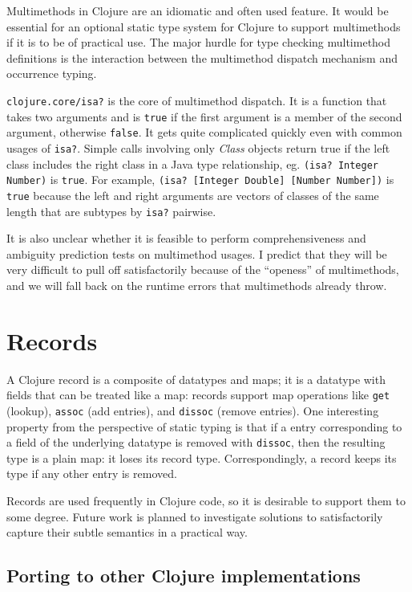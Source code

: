 Multimethods in Clojure are an idiomatic and often used feature.
It would be essential for an optional static type system for Clojure to support
multimethods if it is to be of practical use.
The major hurdle for type checking multimethod definitions is the
interaction between the multimethod dispatch mechanism and occurrence typing.

\lstinline|clojure.core/isa?| is the core of multimethod dispatch.
It is a function that takes two arguments and is \lstinline|true| if
the first argument is a member of the second argument, otherwise \lstinline|false|.
It gets quite complicated quickly even with common usages of \lstinline|isa?|.
Simple calls involving only \emph{Class} objects return true if the left class
includes the right class in a Java type relationship, eg. \lstinline|(isa? Integer Number)| is \lstinline|true|.
For example, \lstinline|(isa? [Integer Double] [Number Number])| is \lstinline|true|
because the left and right arguments are vectors of classes of the same length
that are subtypes by \lstinline|isa?| pairwise.

It is also unclear whether it is feasible to perform comprehensiveness and
ambiguity prediction tests on multimethod usages. I predict that they will be
very difficult to pull off satisfactorily because of the ``openess'' of multimethods,
and we will fall back on the runtime errors that multimethods already throw.

\section{Records}

A Clojure record is a composite of datatypes and maps; it is a datatype
with fields that can be treated like a map: records support map operations like \lstinline|get| (lookup),
\lstinline|assoc| (add entries), and \lstinline|dissoc| (remove entries).
One interesting property from the perspective of static typing is that if
a entry corresponding to a field of the underlying datatype is removed
with \lstinline|dissoc|, then the resulting type is a plain map: it loses
its record type.
Correspondingly, a record keeps its type if any other entry is removed.

Records are used frequently in Clojure code, so it is desirable
to support them to some degree. Future work is planned to investigate solutions
to satisfactorily capture their subtle semantics in a practical way.

\subsection{Porting to other Clojure implementations}

